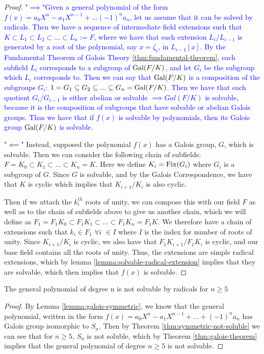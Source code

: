 \begin{proof}
    \textcolor{blue}{"$\implies $"Given a general polynomial of the form $f(x) = a_0X^n - a_1X^{n-1}+...(-1)^na_n$, let us assume that it can be solved by radicals. Then we have a sequence of intermediate field extensions such that $K \subset L_1 \subset L_2 \subset ... \subset L_n :=F$, where we have that each extension $L_i/L_{i-1}$ is generated by a root of the polynomial, say $x=\zeta_i$, in $L_{i-1}[x].$
    By the Fundamental Theorem of Galois Theory \ref{thm:fundamental-theorem}, each subfield $L_i$ corresponds to a subgroup of $\operatorname{Gal}(F/K)$, and let $G_i$ be the subgroup which $L_i$ corresponds to. Then we can say that $\operatorname{Gal}(F/K)$ is a composition of the subgroups $G_i$:
    $1=G_1\subseteq G_2 \subseteq ... \subseteq G_n = \operatorname{Gal}(F/K)$. 
    Then we have that each quotient $G_i/G_{i-1}$ is either abelian or solvable $\implies Gal(F/K)$ is solvable, because it is the composition of subgroups that have solvable or abelian Galois groups.
    \newline Thus we have that if $f(x)$ is solvable by polynomials, then its Galois group $\operatorname{Gal}(F/K)$ is solvable.
    }

    "$\impliedby$" Instead, supposed the polynomial $f(x)$ has a Galois group, $G$, which is solvable. Then we can consider the following chain of subfields: $F=K_0\subset K_1 \subset ... \subset K_n = K$. Here we define $K_i = \operatorname{Fix}(G_i)$ where $G_i$ is a subgroup of $G$.
    Since $G$ is solvable, and by the Galois Correspondence, we have that $K$ is cyclic which implies that $K_{i+1}/K_i$ is also cyclic.

    Then if we attach the $k_i^{th}$ roots of unity, we can compose this with our field $F$ as well as to the chain of subfields above to give us another chain, which we will define as $F_1 = F_1K_0 \subset F_1K_1 \subset ... \subset F_1K_n = F_1K$. We therefore have a chain of extensions such that $k_i \in F_1$ $\forall i$ \hspace{0.1cm} $\in I$ where $I$ is the index for number of roots of unity. Since $K_{i+1}/K_i$ is cyclic, we also have that $F_1K_{i+1}/F_1K_i$ is cyclic, and our base field contains all the roots of unity. Thus, the extensions are simple radical extensions, which by lemma \ref{lemma:solvable-radical-extension} implies that they are solvable, which then implies that $f(x)$ is solvable.
\end{proof}

\begin{theorem}\label{thm:abel-ruffini-thm}
    The general polynomial of degree n is not solvable by radicals for $n \ge 5$
\end{theorem}

\begin{proof}
    By Lemma \ref{lemma:galois-symmetric}, we know that the general polynomial, written in the form $f(x)=a_0X^n - a_1X^{n-1} + ... + (-1)^na_n$ has Galois group isomorphic to $S_n$. Then by Theorem \ref{thm:symmetric-not-soluble} we can see that for $n \geq 5$, $S_n$ is not soluble, which by Theorem \ref{thm:galois-theorem} implies that the general polynomial of degree $n \geq 5$ is not solvable.
\end{proof}
